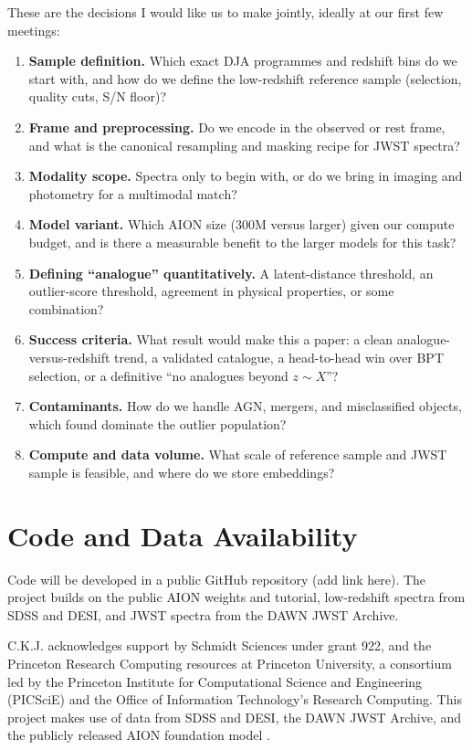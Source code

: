 \documentclass[onecolumn,astrosymb,tighten,longbib,trackchanges]{aastex7} %
\newcommand{\aion}{\textsc{AION}\xspace}
\newcommand{\zsim}{z\!\sim\!}
\begin{document}
These are the decisions I would like us to make jointly, ideally at our first few meetings:
\begin{enumerate}
  \item \textbf{Sample definition.} Which exact DJA programmes and redshift bins do we start with,
        and how do we define the low-redshift reference sample (selection, quality cuts, S/N floor)?
  \item \textbf{Frame and preprocessing.} Do we encode in the observed or rest frame, and what is the
        canonical resampling and masking recipe for JWST spectra?
  \item \textbf{Modality scope.} Spectra only to begin with, or do we bring in imaging and
        photometry for a multimodal match?
  \item \textbf{Model variant.} Which \aion size (300M versus larger) given our compute budget, and
        is there a measurable benefit to the larger models for this task?
  \item \textbf{Defining ``analogue'' quantitatively.} A latent-distance threshold, an outlier-score
        threshold, agreement in physical properties, or some combination?
  \item \textbf{Success criteria.} What result would make this a paper: a clean
        analogue-versus-redshift trend, a validated catalogue, a head-to-head win over BPT selection,
        or a definitive ``no analogues beyond $\zsim X$''?
  \item \textbf{Contaminants.} How do we handle AGN, mergers, and misclassified objects, which
        \citet{Liang2023_outlier_detection} found dominate the outlier population?
  \item \textbf{Compute and data volume.} What scale of reference sample and JWST sample is feasible,
        and where do we store embeddings?
\end{enumerate}


\section{Code and Data Availability} \label{sec:dataavail}

Code will be developed in a public GitHub repository (add link here). The project builds on the
public \aion weights and tutorial, low-redshift spectra from SDSS and DESI, and JWST spectra from the
DAWN JWST Archive.

\begin{acknowledgments}
C.K.J. acknowledges support by Schmidt Sciences under grant 922, and the Princeton Research Computing
resources at Princeton University, a consortium led by the Princeton Institute for Computational
Science and Engineering (PICSciE) and the Office of Information Technology's Research Computing. This
project makes use of data from SDSS and DESI, the DAWN JWST Archive, and the publicly released \aion
foundation model \citep{Parker2025_AION_omnimodal}.
\end{acknowledgments}
\end{document}
